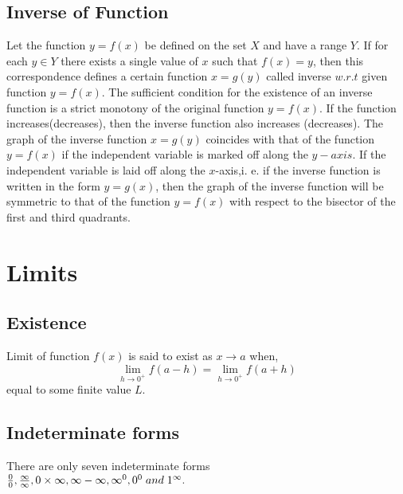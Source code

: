 \documentclass[twocolumn, 10pt]{article}
\begin{document}
\subsection{Inverse of Function}
Let the function $y=f(x)$ be defined on the set $X$ and have a
range $Y$. If for each $y \in Y$ there exists a single value of $x$ such that $f(x) = y$, then this correspondence defines a certain function $x = g (y)$ called inverse $w.r.t$ given function $y= f(x)$. The sufficient condition for the existence of an inverse function is a strict monotony of the original function $y = f (x)$. If the function increases(decreases), then the inverse function also increases (decreases). The graph of the inverse function $x = g (y)$ coincides with that of the function $y=f(x)$ if the independent variable is marked off along the $y-axis$. If the independent variable is laid off along the $x$-axis,i. e. if the inverse function is written in the form $y = g (x)$, then the graph of the inverse function will be symmetric to that of the function $y = f (x)$ with respect to the bisector of the first and third quadrants.

\section{Limits}
\subsection{Existence}
Limit of function $f(x)$ is said to exist as $x \to a$ when,
$$\lim_{h \to 0^+} f(a-h)=\lim_{h \to 0^+} f(a+h)$$ equal to some finite value $L$.
\subsection{Indeterminate forms}
There are only seven indeterminate forms \\
$\frac{0}{0},\frac{\infty}{\infty},0 \times \infty, \infty - \infty, \infty^0, 0^0 \thickspace and \thickspace 1^{\infty}.$
\end{document}
